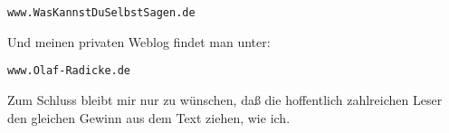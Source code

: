 \begin{center}
\texttt{www.WasKannstDuSelbstSagen.de}
\end{center}

Und meinen privaten Weblog findet man unter:

\begin{center}
\texttt{www.Olaf-Radicke.de}
\end{center}

Zum Schluss bleibt mir nur zu wünschen, daß die hoffentlich zahlreichen Leser
den gleichen Gewinn aus dem Text ziehen, wie ich.


